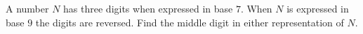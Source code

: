 A number $N$ has three digits when expressed in base $7$. When $N$ is expressed in base $9$ the digits are reversed. Find the middle digit in either representation of $N$. 